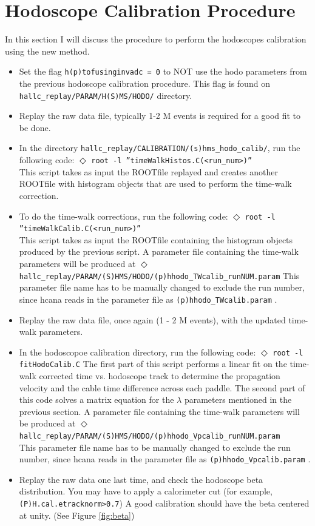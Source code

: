 \documentclass[14pt]{article}
\begin{document}
\renewcommand{\labelitemi}{$\blacksquare$}


\section{Hodoscope Calibration Procedure}
In this section I will discuss the procedure to perform the hodoscopes calibration
using the new method.
\begin{itemize}
\item Set the flag \texttt{h(p)tofusinginvadc = 0} to NOT use the hodo parameters from the
  previous hodoscope calibration procedure. This flag is found on \texttt{hallc\_replay/PARAM/H(S)MS/HODO/} directory.
\item Replay the raw data file, typically 1-2 M events is required for a good fit to be done.   
\item In the directory \texttt{hallc\_replay/CALIBRATION/(s)hms\_hodo\_calib/}, run the following code:
  \subitem $\Diamond$ {\texttt{root -l ''timeWalkHistos.C(<run\_num>)''} \\
  This script takes as input the ROOTfile replayed and creates another ROOTfile with histogram
  objects that are used to perform the time-walk correction.}
\item To do the time-walk corrections, run the following code:
  \subitem $\Diamond$ {\texttt{root -l ''timeWalkCalib.C(<run\_num>)''}} \\
  This script takes as input the ROOTfile containing the histogram objects produced by the previous
  script.  A parameter file containing the time-walk parameters will be produced at 
  \subitem $\Diamond$ {\texttt{hallc\_replay/PARAM/(S)HMS/HODO/(p)hhodo\_TWcalib\_runNUM.param}}
  This parameter file name has to be manually changed to exclude the run number, since hcana reads in the parameter file as
  \texttt{(p)hhodo\_TWcalib.param} .
\item Replay the raw data file, once again (1 - 2 M events), with the updated time-walk parameters.
\item In the hodoscopoe calibration directory, run the following code:
  \subitem $\Diamond$ {\texttt{root -l fitHodoCalib.C}}
  The first part of this script performs a linear fit on the time-walk corrected time vs. hodoscope track
  to determine the propagation velocity and the cable time difference across each paddle. The second part of
  this code solves a matrix equation for the $\lambda$ parameters mentioned in the previous section.
  A parameter file containing the time-walk parameters will be produced at
  \subitem $\Diamond$ {\texttt{hallc\_replay/PARAM/(S)HMS/HODO/(p)hhodo\_Vpcalib\_runNUM.param}} \\
  This parameter file name has to be manually changed to exclude the run number, since hcana reads in the parameter file as
  \texttt{(p)hhodo\_Vpcalib.param} .
\item {Replay the raw data one last time, and check the hodoscope beta distribution. You may have to apply a calorimeter cut (for example, \texttt{(P)H.cal.etracknorm>0.7})}
  A good calibration should have the beta centered at unity. (See Figure \ref{fig:beta})
\end{itemize}
\end{document}
